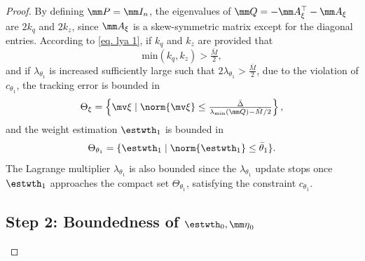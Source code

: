 \documentclass[letterpaper, 10 pt, conference]{ieeeconf}  %
\begin{document}
\begin{proof}
By defining $\mm P=\mm I_n$, the eigenvalues of $\mm Q=-\mm A_\xi^\top -\mm A_\xi$ are $2k_q$ and $2k_z$, since $\mm A_\xi$ is a skew-symmetric matrix except for the diagonal entries.
According to \eqref{eq. lya 1}, if $k_q$ and $k_z$ are provided that
\begin{equation}
    \text{min}(k_q,k_z)>\tfrac{\bar M}{2}
    ,
    \label{eq. ctrl stable condition}
\end{equation}
and if $\lambda_{\theta_1}$ is increased sufficiently large such that $2\lambda_{\theta_1}>\tfrac{\bar M}{2}$, due to the violation of $c_{\theta_1}$, the tracking error is bounded in
\begin{equation}
    \Theta_\xi = 
    \left\{
        \mv\xi\mid
        \norm{\mv\xi}
        \le  
        \tfrac{
            \bar \Delta
        }{
            \lambda _\text{min}(\mm Q)-{\bar M}/{2}
        } 
    \right\}
    ,
\end{equation}
and the weight estimation $\estwth_1$ is bounded in
\begin{equation}
    \Theta_{{\theta}_1} = 
    \{ 
        {\estwth_1} 
        \mid
        \norm{\estwth_1}
        \le  
        \bar\theta_1
    \}
    .
\end{equation}
The Lagrange multiplier $\lambda_{\theta_1}$ is also bounded since the $\lambda_{\theta_1}$ update stops once ${\estwth}_1$ approaches the compact set $\Theta_{{\theta}_1}$, satisfying the constraint $c_{\theta_1}$.

\subsection*{Step 2: Boundedness of ${\estwth}_0,{\mm \eta}_0$}


\end{proof}
\end{document}
